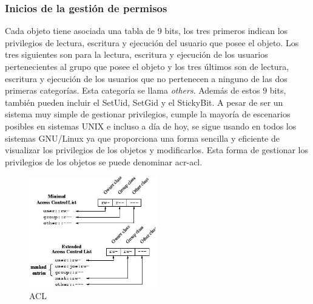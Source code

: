 \documentclass[titlepage, 12pt, a4paper]{article}
\begin{document}
\subsubsection{Inicios de la gestión de permisos}
Cada objeto tiene asociada una tabla de 9 bits, los tres primeros indican los privilegios de lectura, escritura y ejecución del usuario que posee el objeto. Los tres siguientes son para la lectura, escritura y ejecución de los usuarios pertenecientes al grupo que posee el objeto y los tres últimos son de lectura, escritura y ejecución de los usuarios que no pertenecen a ninguno de las dos primeras categorías. Esta categoría se llama \textit{others}. Además de estos 9 bits, también pueden incluir el \gls{SetUid}, \gls{SetGid} y el \gls{StickyBit}. A pesar de ser un sistema muy simple de gestionar privilegios, cumple la mayoría de escenarios posibles en sistemas UNIX e incluso a día de hoy, se sigue usando en todos los sistemas \gls{GNU/Linux} ya que proporciona una forma sencilla y eficiente de visualizar los privilegios de los objetos y modificarlos. Esta forma de gestionar los privilegios de los objetos se puede denominar \gls{acr-acl}.
\begin{figure}[H]
    \centering
    \includegraphics[width=0.5\textwidth]{Media/ACL.jpg}
    \caption{\gls{ACL}}
    \label{fig:ACL}
\end{figure}
\end{document}
